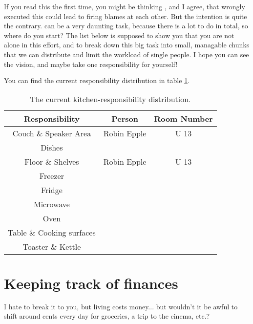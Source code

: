 If you read this the first time, you might be thinking , and I agree, that wrongly executed this could lead to firing blames at each other. But the intention is quite the contrary.  can be a very daunting task, because there is a lot to do in total, so where do you start? The list below is supposed to show you that you are not alone in this effort, and to break down this big task into small, managable chunks that we can distribute and limit the workload of single people. I hope you can see the vision, and maybe take one responsibility for yourself!

You can find the current responsibility distribution in table \ref{tab:kitchen-responsibilities}.

\begin{table}[htp]
    \centering
    \begin{tabular}{ccc}
        \rowcolor[HTML]{F89646} 
        Responsibility            & Person      & Room Number \\ \hline
        Couch \& Speaker Area     & Robin Epple & U 13        \\ \hline
        Dishes                    &             &             \\ \hline
        Floor \& Shelves          & Robin Epple & U 13        \\ \hline
        Freezer                   &             &             \\ \hline
        Fridge                    &             &             \\ \hline
        Microwave                 &             &             \\ \hline
        Oven                      &             &             \\ \hline
        Table \& Cooking surfaces &             &             \\ \hline
        Toaster \& Kettle         &             &             \\ \hline
    \end{tabular}
    \caption{The current kitchen-responsibility distribution.}
    \label{tab:kitchen-responsibilities}
\end{table}

\section{Keeping track of finances}
I hate to break it to you, but living costs money... but wouldn't it be awful to shift around cents every day for groceries, a trip to the cinema, etc.?


